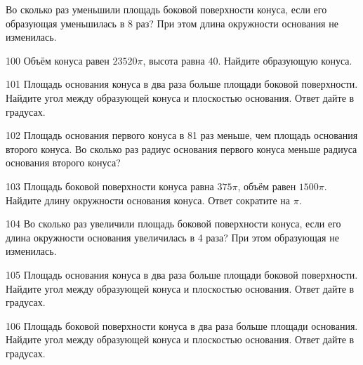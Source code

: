 \documentclass[a4paper]{article}
\begin{document}
\begin{taskBN}{99}
Во сколько раз уменьшили площадь боковой поверхности конуса, если его образующая уменьшилась в 8 раз? При этом длина окружности основания не изменилась.
\end{taskBN}

\begin{taskBN}{100}
Объём конуса равен $23520\pi$, высота равна $40$. Найдите образующую конуса. 
\end{taskBN}

\begin{taskBN}{101}
Площадь основания конуса в два раза больше площади боковой поверхности. Найдите угол между образующей конуса и плоскостью основания. Ответ дайте в градусах.
\end{taskBN}

\begin{taskBN}{102}
Площадь основания первого конуса в 81 раз меньше, чем площадь основания второго конуса. Во сколько раз радиус основания первого конуса меньше радиуса основания второго конуса?
\end{taskBN}

\begin{taskBN}{103}
Площадь боковой поверхности конуса равна $375\pi$, объём равен $1500\pi$. Найдите длину окружности основания конуса. Ответ сократите на $\pi$.
\end{taskBN}

\begin{taskBN}{104}
Во сколько раз увеличили площадь боковой поверхности конуса, если его длина окружности основания увеличилась в 4 раза? При этом образующая не изменилась.
\end{taskBN}

\begin{taskBN}{105}
Площадь основания конуса в два раза больше площади боковой поверхности. Найдите угол между образующей конуса и плоскостью основания. Ответ дайте в градусах.
\end{taskBN}

\begin{taskBN}{106}
Площадь боковой поверхности конуса в два раза больше площади основания. Найдите угол между образующей конуса и плоскостью основания. Ответ дайте в градусах.
\end{taskBN}
\end{document}
